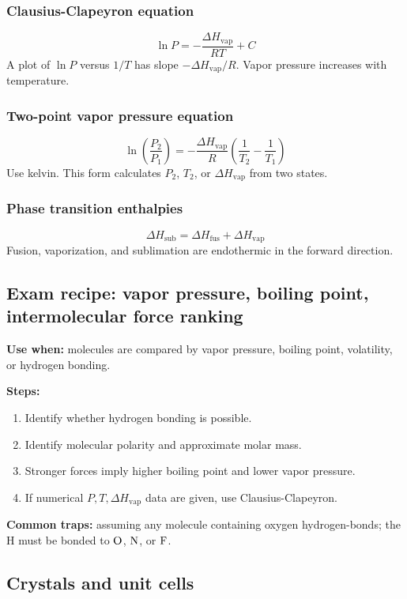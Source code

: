\subsubsection{Clausius-Clapeyron equation}
\[
\ln P=-\frac{\Delta H_{\mathrm{vap}}}{RT}+C
\]
A plot of \(\ln P\) versus \(1/T\) has slope \(-\Delta H_{\mathrm{vap}}/R\). Vapor pressure increases with temperature.

\subsubsection{Two-point vapor pressure equation}
\[
\ln\left(\frac{P_2}{P_1}\right)
=-\frac{\Delta H_{\mathrm{vap}}}{R}\left(\frac{1}{T_2}-\frac{1}{T_1}\right)
\]
Use kelvin. This form calculates \(P_2\), \(T_2\), or \(\Delta H_{\mathrm{vap}}\) from two states.

\subsubsection{Phase transition enthalpies}
\[
\Delta H_{\mathrm{sub}}=\Delta H_{\mathrm{fus}}+\Delta H_{\mathrm{vap}}
\]
Fusion, vaporization, and sublimation are endothermic in the forward direction.

\subsection{Exam recipe: vapor pressure, boiling point, intermolecular force ranking}
\textbf{Use when:} molecules are compared by vapor pressure, boiling point, volatility, or hydrogen bonding.

\textbf{Steps:}
\begin{enumerate}
    \item Identify whether hydrogen bonding is possible.
    \item Identify molecular polarity and approximate molar mass.
    \item Stronger forces imply higher boiling point and lower vapor pressure.
    \item If numerical \(P,T,\Delta H_{\mathrm{vap}}\) data are given, use Clausius-Clapeyron.
\end{enumerate}

\textbf{Common traps:} assuming any molecule containing oxygen hydrogen-bonds; the H must be bonded to \(\ce{O}\), \(\ce{N}\), or \(\ce{F}\).

\subsection{Crystals and unit cells}

